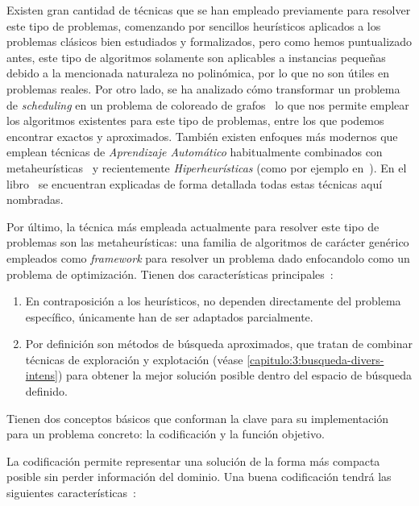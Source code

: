 Existen gran cantidad de técnicas que se han empleado previamente para resolver este tipo de problemas, comenzando por sencillos heurísticos aplicados a los problemas clásicos bien estudiados y formalizados, pero como hemos puntualizado antes, este tipo de algoritmos solamente son aplicables a instancias pequeñas debido a la mencionada naturaleza no polinómica, por lo que no son útiles en problemas reales. Por otro lado, se ha analizado cómo transformar un problema de \textit{scheduling} en un problema de coloreado de grafos~\cite{sota:estudio-coloreado-grafos, sota:algotimo-coloreado-grafos} lo que nos permite emplear los algoritmos existentes para este tipo de problemas, entre los que podemos encontrar exactos y aproximados. También existen enfoques más modernos que emplean técnicas de \textit{Aprendizaje Automático} habitualmente combinados con metaheurísticas~\cite{sota:machine-learning-geneticos} y recientemente \textit{Hiperheurísticas} (como por ejemplo en~\cite{sota:hiperheuristicas}). En el libro~\cite{sota:libro-sota-scheduling} se encuentran explicadas de forma detallada todas estas técnicas aquí nombradas.

Por último, la técnica más empleada actualmente para resolver este tipo de problemas son las metaheurísticas: una familia de algoritmos de carácter genérico empleados como \textit{framework} para resolver un problema dado enfocandolo como un problema de optimización. Tienen dos características principales~\cite{sota:metaheuristicas}:

\begin{enumerate}
	\item En contraposición a los heurísticos, no dependen directamente del problema específico, únicamente han de ser adaptados parcialmente.
	\item Por definición son métodos de búsqueda aproximados, que tratan de combinar técnicas de exploración y explotación (véase \autoref{capitulo:3:busqueda-divers-intens}) para obtener la mejor solución posible dentro del espacio de búsqueda definido.
\end{enumerate}

Tienen dos conceptos básicos que conforman la clave para su implementación para un problema concreto: la codificación y la función objetivo. 

La codificación permite representar una solución de la forma más compacta posible sin perder información del dominio. Una buena codificación tendrá las siguientes características~\cite{sota:metaheuristicas-design-impl}:

